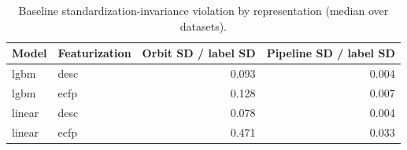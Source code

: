 \begin{table}
\caption{Baseline standardization-invariance violation by representation (median over datasets).}
\label{tab:table2_invariance}
\begin{tabular}{llrr}
\toprule
Model & Featurization & Orbit SD / label SD & Pipeline SD / label SD \\
\midrule
lgbm & desc & 0.093 & 0.004 \\
lgbm & ecfp & 0.128 & 0.007 \\
linear & desc & 0.078 & 0.004 \\
linear & ecfp & 0.471 & 0.033 \\
\bottomrule
\end{tabular}
\end{table}
